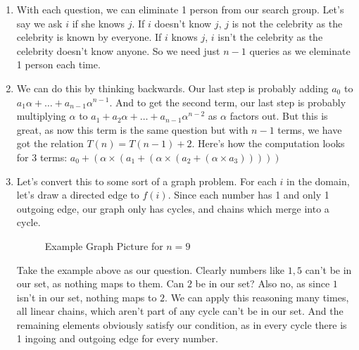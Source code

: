 \documentclass[12pt]{report}
\begin{document}
\begin{enumerate}[label=\textbf{\arabic*.}]
  \item With each question, we can eliminate 1 person from our search group. Let's say we ask $i$ if she knows $j$.
  If $i$ doesn't know $j$, $j$ is not the celebrity as the celebrity is known by everyone. If $i$ knows $j$, $i$ isn't
  the celebrity as the celebrity doesn't know anyone. So we need just $n-1$ queries as we eleminate 1 person each time.

  \item We can do this by thinking backwards. Our last step is probably adding $a_0$ to $a_1 \alpha + \dots + a_{n-1} 
  \alpha^{n-1}$. And to get the second term, our last step is probably multiplying $\alpha$ to $a_1 + a_2 \alpha + \dots 
  + a_{n-1} \alpha^{n-2}$ as $\alpha$ factors out. But this is great, as now this term is the same question but with 
  $n-1$ terms, we have got the relation $T(n) = T(n-1) + 2$. Here's how the computation looks for 3 terms: $a_0 + 
  (\alpha \times (a_1 + (\alpha \times (a_2 + (\alpha \times a_3)))))$
  
  \item Let's convert this to some sort of a graph problem. For each $i$ in the domain, let's draw a directed edge
  to $f(i)$. Since each number has 1 and only 1 outgoing edge, our graph only has cycles, and chains which merge into
  a cycle.

  \begin{figure}[ht]
  \centering
    \caption*{Example Graph Picture for $n = 9$}
  \end{figure}

  Take the example above as our question. Clearly numbers like $1, 5$ can't be in our set, as nothing maps to them. Can
  $2$ be in our set? Also no, as since $1$ isn't in our set, nothing maps to $2$. We can apply this reasoning many times, 
  all linear chains, which aren't part of any cycle can't be in our set. And the remaining elements obviously satisfy our 
  condition, as in every cycle there is 1 ingoing and outgoing edge for every number.


\end{enumerate}
\end{document}
